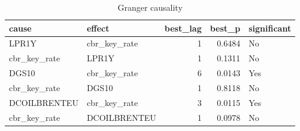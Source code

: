 \begin{table}
\caption{Granger causality}
\label{tab:5_4}
\begin{tabular}{llrrl}
\toprule
cause & effect & best_lag & best_p & significant \\
\midrule
LPR1Y & cbr_key_rate & 1 & 0.6484 & No \\
cbr_key_rate & LPR1Y & 1 & 0.1311 & No \\
DGS10 & cbr_key_rate & 6 & 0.0143 & Yes \\
cbr_key_rate & DGS10 & 1 & 0.8118 & No \\
DCOILBRENTEU & cbr_key_rate & 3 & 0.0115 & Yes \\
cbr_key_rate & DCOILBRENTEU & 1 & 0.0978 & No \\
\bottomrule
\end{tabular}
\end{table}
